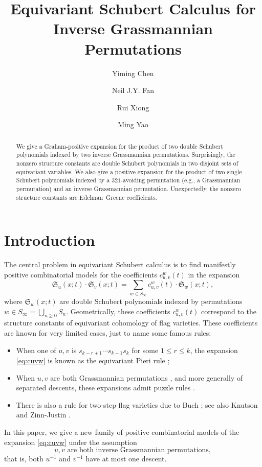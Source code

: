 \documentclass[12pt,reqno]{amsart}
\title{Equivariant Schubert Calculus for\\
Inverse Grassmannian Permutations}
\author{Yiming Chen}
\author{Neil J.Y. Fan}
\author{Rui Xiong}
\author{Ming Yao}
\numberwithin{equation}{section}
\theoremstyle{definition}
\begin{document}
\def\vv{\mathbf{v}}




\begin{abstract}
We give a Graham-positive expansion for the product of two double Schubert polynomials indexed by two inverse Grassmannian permutations. Surprisingly, the nonzero structure constants are double Schubert polynomials in two disjoint sets of equivariant variables. 
We also give a positive expansion for the product of two single Schubert polynomials indexed by a $321$-avoiding permutation (e.g., a Grassmannian permutation) and an inverse Grassmannian permutation. Unexpectedly, the nonzero structure constants are Edelman--Greene coefficients. 

\end{abstract}

\maketitle



\setcounter{tocdepth}{1}
\tableofcontents


\section{Introduction}


The central problem in equivariant Schubert calculus is to find manifestly positive combinatorial models for the coefficients $c_{u,v}^w(t)$ in the expansion
\begin{equation}\label{eq:cuvw}
\mathfrak{S}_u(x;t)\cdot \mathfrak{S}_{v}(x;t)
=\sum_{w\in S_\infty} c_{u,v}^w(t)\cdot\mathfrak{S}_{w}(x;t),
\end{equation}
where $\mathfrak{S}_w(x;t)$ are double Schubert polynomials  indexed by permutations $w\in S_\infty = \bigcup_{n\geq 0} S_n$. 
Geometrically, these coefficients $c_{u,v}^w(t)$ correspond to the structure constants of equivariant cohomology of flag varieties. 
These coefficients are known for very limited cases, just to name some famous rules: 
\begin{itemize}
   \item When one of $u,v$ is $s_{k-r+1}\cdots s_{k-1}s_k$ for some $1\leq r\leq k$, the expansion \eqref{eq:cuvw} is known as  the equivariant Pieri rule \cite{Robinson,LSY}; 
    \item When $u,v$ are both Grassmannian permutations \cite{KT03,MS99,PeYo15-1,PeYo15-2,Wheeler}, and more generally of separated descents,     these expansions admit  puzzle rules \cite{Pzz3}. 
    \item There is also a rule for two-step flag varieties due to Buch \cite{Buch}; see also Knutson and Zinn-Justin \cite{Pzz1}. 
\end{itemize}
In this paper, we  give a new family of positive combinatorial models of the expansion \eqref{eq:cuvw} under the assumption 
\begin{equation}\label{eq:invGr}
\text{$u,v$ are both inverse Grassmannian permutations}, 
\end{equation}
that is, both $u^{-1}$ and $v^{-1}$ have at most one descent. 
\end{document}
